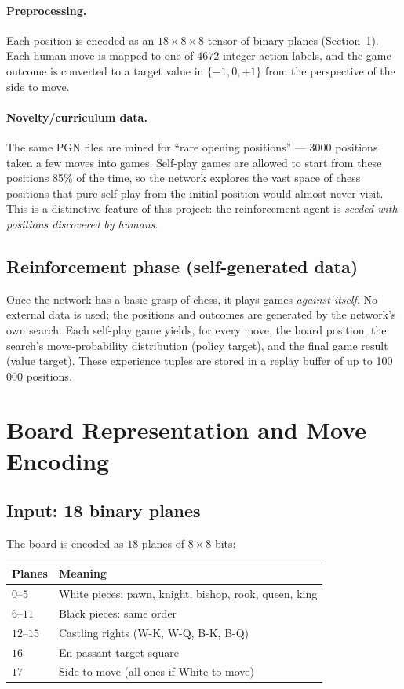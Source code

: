 \documentclass[11pt,a4paper]{article}
\begin{document}
\paragraph{Preprocessing.}
Each position is encoded as an $18\times8\times8$ tensor of binary planes
(Section~\ref{sec:repr}). Each human move is mapped to one of $4672$ integer
action labels, and the game outcome is converted to a target value in
$\{-1,0,+1\}$ from the perspective of the side to move.

\paragraph{Novelty/curriculum data.}
The same PGN files are mined for ``rare opening positions'' --- 3000 positions
taken a few moves into games. Self-play games are allowed to start from these
positions 85\% of the time, so the network explores the vast space of chess
positions that pure self-play from the initial position would almost never
visit. This is a distinctive feature of this project: the reinforcement agent
is \emph{seeded with positions discovered by humans}.

\subsection{Reinforcement phase (self-generated data)}
Once the network has a basic grasp of chess, it plays games \emph{against
itself}. No external data is used; the positions and outcomes are generated by
the network's own search. Each self-play game yields, for every move, the board
position, the search's move-probability distribution (policy target), and the
final game result (value target). These experience tuples are stored in a
replay buffer of up to 100\,000 positions.

\section{Board Representation and Move Encoding}
\label{sec:repr}

\subsection{Input: 18 binary planes}
The board is encoded as $18$ planes of $8\times8$ bits:
\begin{center}
\begin{tabular}{ll}
\toprule
Planes & Meaning \\
\midrule
$0$--$5$   & White pieces: pawn, knight, bishop, rook, queen, king \\
$6$--$11$  & Black pieces: same order \\
$12$--$15$ & Castling rights (W-K, W-Q, B-K, B-Q) \\
$16$       & En-passant target square \\
$17$       & Side to move (all ones if White to move) \\
\bottomrule
\end{tabular}
\end{center}
\end{document}
